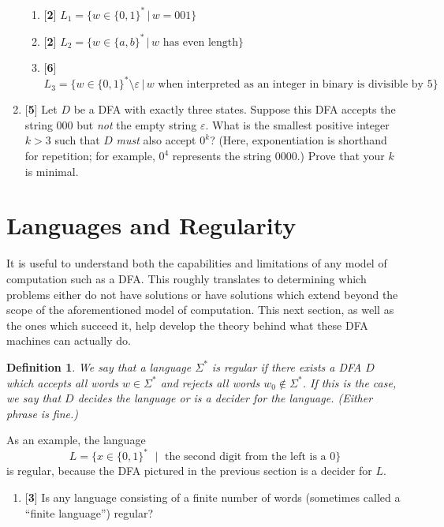 \documentclass[11pt]{article}
\newtheorem{defn}{Definition}[section]
\newcounter{enum}
\begin{document}
\begin{enumerate}
\begin{enumerate}
\item {[}\textbf{2}{]} $L_1 = \{w\in\{0,1\}^*\,|\,w=001\}$

\item {[}\textbf{2}{]} $L_2 = \{w\in\{a,b\}^*\,|\,w\text{ has even length}\}$

\item {[}\textbf{6}{]} $L_3=\{w\in\{0,1\}^*\setminus\varepsilon\,|\,w\text{ when interpreted as an integer in binary is divisible by 5}\}$

\end{enumerate}

\item {[}\textbf{5}{]} Let $D$ be a DFA with exactly three states.  Suppose this DFA accepts the string $000$ but \textit{not} the empty string $\varepsilon$.  What is the smallest positive integer $k>3$ such that $D$ \textit{must} also accept $0^k$? (Here, exponentiation is shorthand for repetition; for example, $0^4$ represents the string $0000$.) Prove that your $k$ is minimal.

\end{enumerate}

\section{Languages and Regularity}

\par It is useful to understand both the capabilities and limitations of any model of computation such as a DFA.  This roughly translates to determining which problems either do not have solutions or have solutions which extend beyond the scope of the aforementioned model of computation.  This next section, as well as the ones which succeed it, help develop the theory behind what these DFA machines can actually do.

\begin{defn}We say that a language $\Sigma^*$ is \textit{regular} if there exists a DFA $D$ which accepts all words $w\in\Sigma^*$ and rejects all words $w_0\not\in\Sigma^*$.  If this is the case, we say that $D$ \textit{decides} the language or is a \textit{decider} for the language.  (Either phrase is fine.)
\end{defn}

As an example, the language \[L=\{x\in\{0,1\}^*\,\,\mid\,\,\text{the second digit from the left is a 0}\}\] is regular, because the DFA pictured in the previous section is a decider for $L$.

\begin{enumerate}
\setcounter{enumi}{\theenum}

\item {[}\textbf{3}{]} Is any language consisting of a finite number of words (sometimes called a ``finite language'') regular?

\setcounter{enum}{\theenumi}
\end{enumerate}
\end{document}
